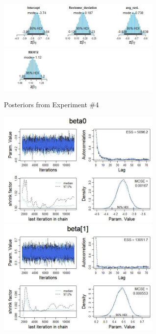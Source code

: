 \documentclass[man, floatsintext, 10pt]{apa6}
\begin{document}
\begin{figure}
\includegraphics[width=8cm]{posteriors_bdata_03.jpg}
\includegraphics[width=8cm]{pposteriors_bdata_03.jpg}
\caption{Posteriors from Experiment \#4}
  \label{Exp4}
\end{figure}

\begin{figure}
\includegraphics[width=8cm]{Intercept_exp4.jpg}
\includegraphics[width=8cm]{ReviewerDevExp4.jpg} \\


\end{figure}
\end{document}
